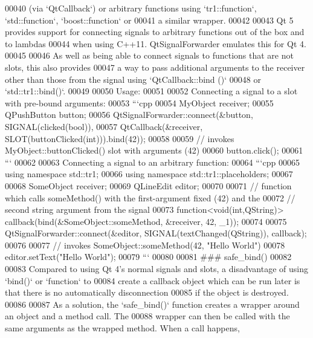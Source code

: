 \begin{DoxyCode}
00040 (via `QtCallback`) or arbitrary functions \textcolor{keyword}{using} `tr1::function`, `std::function`, `boost::function` or
00041 a similar wrapper.
00042 
00043 Qt 5 provides support \textcolor{keywordflow}{for} connecting signals to arbitrary functions out of the box and to lambdas
00044 when \textcolor{keyword}{using} C++11.  QtSignalForwarder emulates \textcolor{keyword}{this} \textcolor{keywordflow}{for} Qt 4.
00045 
00046 As well as being able to connect signals to functions that are not slots, \textcolor{keyword}{this} also provides
00047 a way to pass additional arguments to the receiver other than those from the signal \textcolor{keyword}{using} `QtCallback::bind
      ()`
00048 or `std::tr1::bind()`.
00049 
00050 Usage:
00051 
00052 Connecting a signal to a slot with pre-bound arguments:
00053 ```cpp
00054 MyObject receiver;
00055 QPushButton button;
00056 QtSignalForwarder::connect(&button, SIGNAL(clicked(\textcolor{keywordtype}{bool})),
00057   QtCallback(&receiver, SLOT(buttonClicked(\textcolor{keywordtype}{int}))).bind(42));
00058 
00059 \textcolor{comment}{// invokes MyObject::buttonClicked() slot with arguments (42)}
00060 button.click();
00061 ```
00062 
00063 Connecting a signal to an arbitrary \textcolor{keyword}{function}:
00064 ```cpp
00065 \textcolor{keyword}{using namespace }std::tr1;
00066 \textcolor{keyword}{using namespace }std::tr1::placeholders;
00067 
00068 SomeObject receiver;
00069 QLineEdit editor;
00070 
00071 \textcolor{comment}{// function which calls someMethod() with the first-argument fixed (42) and the}
00072 \textcolor{comment}{// second string argument from the signal}
00073 function<void(int,QString)> callback(bind(&SomeObject::someMethod, &receiver, 42, \_1));
00074 
00075 QtSignalForwarder::connect(&editor, SIGNAL(textChanged(QString)), callback);
00076   
00077 \textcolor{comment}{// invokes SomeObject::someMethod(42, "Hello World")}
00078 editor.setText(\textcolor{stringliteral}{"Hello World"});
00079 ```
00080 
00081 \textcolor{preprocessor}{### safe\_bind()}
00082 \textcolor{preprocessor}{}
00083 Compared to \textcolor{keyword}{using} Qt 4\textcolor{stringliteral}{'s normal signals and slots, a disadvantage of using `bind()` or `function` to}
00084 \textcolor{stringliteral}{create a callback object which can be run later is that there is no automatically disconnection}
00085 \textcolor{stringliteral}{if the object is destroyed.}
00086 \textcolor{stringliteral}{}
00087 \textcolor{stringliteral}{As a solution, the `safe\_bind()` function creates a wrapper around an object and a method call.  The}
00088 \textcolor{stringliteral}{wrapper can then be called with the same arguments as the wrapped method.  When a call happens,}

\end{DoxyCode}
